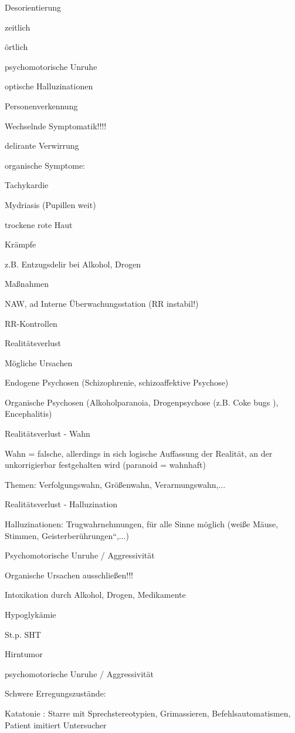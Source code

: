 \documentclass{article}
\begin{document}
Desorientierung

zeitlich

\"ortlich

psychomotorische Unruhe

optische Halluzinationen

Personenverkennung

Wechselnde Symptomatik!!!!

delirante Verwirrung 

organische Symptome:

Tachykardie

Mydriasis (Pupillen weit)

trockene rote Haut

Kr\"ampfe

z.B. Entzugsdelir bei Alkohol, Drogen

Ma{\ss}nahmen

NAW, ad Interne \"Uberwachungsstation (RR  instabil!)

RR-Kontrollen

Realit\"atsverlust

M\"ogliche Ursachen

Endogene Psychosen (Schizophrenie,  schizoaffektive Psychose)

Organische Psychosen (Alkoholparanoia,  Drogenpsychose (z.B. Coke bugs
),  Encephalitis)

Realit\"atsverlust - Wahn

Wahn = falsche, allerdings in sich  logische Auffassung der Realit\"at,
an der  unkorrigierbar festgehalten wird  (paranoid = wahnhaft) 

Themen: Verfolgungswahn, Gr\"o{\ss}enwahn,  Verarmungswahn,...

Realit\"atsverlust - Halluzination

Halluzinationen: Trugwahrnehmungen,  f\"ur alle Sinne m\"oglich
(wei{\ss}e M\"ause,  Stimmen,
{\quotedblbase}Geisterber\"uhrungen{\textquotedblleft},...)

Psychomotorische Unruhe /  Aggressivit\"at

Organische Ursachen ausschlie{\ss}en!!!

Intoxikation durch Alkohol, Drogen,  Medikamente

Hypoglyk\"amie

St.p. SHT

Hirntumor

psychomotorische Unruhe /  Aggressivit\"at

Schwere Erregungszust\"ande:

Katatonie : Starre mit Sprechstereotypien, Grimassieren,
Befehlsautomatismen, Patient imitiert Untersucher
\end{document}
